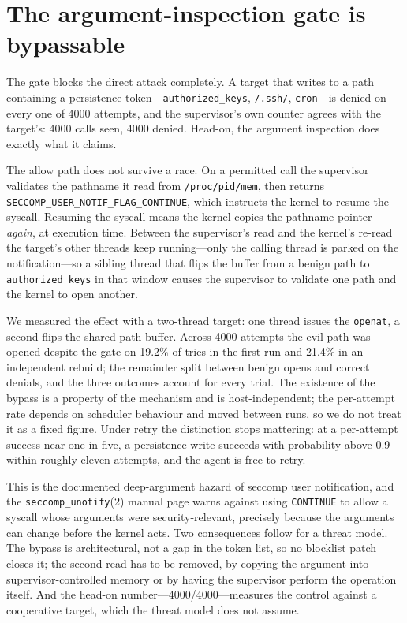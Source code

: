 \documentclass[11pt]{article}
\newcommand{\Nrace}{4000}
\newcommand{\RaceLo}{19.2}
\newcommand{\RaceHi}{21.4}
\begin{document}
\section{The argument-inspection gate is bypassable}\label{sec:toctou}

The gate blocks the direct attack completely. A target that writes to a path containing a
persistence token---\texttt{authorized\_keys}, \texttt{/.ssh/}, \texttt{cron}---is denied on every
one of \Nrace{} attempts, and the supervisor's own counter agrees with the target's: \Nrace{} calls
seen, \Nrace{} denied. Head-on, the argument inspection does exactly what it claims.

The allow path does not survive a race. On a permitted call the supervisor validates the pathname it
read from \texttt{/proc/pid/mem}, then returns \texttt{SECCOMP\_USER\_NOTIF\_FLAG\_CONTINUE}, which
instructs the kernel to resume the syscall. Resuming the syscall means the kernel copies the pathname
pointer \emph{again}, at execution time. Between the supervisor's read and the kernel's re-read the
target's other threads keep running---only the calling thread is parked on the notification---so a
sibling thread that flips the buffer from a benign path to \texttt{authorized\_keys} in that window
causes the supervisor to validate one path and the kernel to open another.

We measured the effect with a two-thread target: one thread issues the \texttt{openat}, a second
flips the shared path buffer. Across \Nrace{} attempts the evil path was opened despite the gate on
\RaceLo\% of tries in the first run and \RaceHi\% in an independent rebuild; the remainder split
between benign opens and correct denials, and the three outcomes account for every trial. The
existence of the bypass is a property of the mechanism and is host-independent; the per-attempt rate
depends on scheduler behaviour and moved between runs, so we do not treat it as a fixed figure. Under
retry the distinction stops mattering: at a per-attempt success near one in five, a persistence write
succeeds with probability above 0.9 within roughly eleven attempts, and the agent is free to retry.

This is the documented deep-argument hazard of seccomp user notification, and the
\texttt{seccomp\_unotify}(2) manual page warns against using \texttt{CONTINUE} to allow a syscall
whose arguments were security-relevant, precisely because the arguments can change before the kernel
acts. Two consequences follow for a threat model. The bypass is architectural, not a gap in the token
list, so no blocklist patch closes it; the second read has to be removed, by copying the argument into
supervisor-controlled memory or by having the supervisor perform the operation itself. And the head-on
number---\Nrace/\Nrace{}---measures the control against a cooperative target, which the threat model
does not assume.
\end{document}
